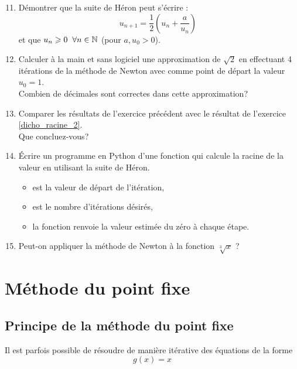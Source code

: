 \documentclass[11pt,a4paper,twoside,greek]{report}
\begin{document}
\bigskip
\begin{boxexstheorieligne}
\begin{enumerate}[label=\textbf{E\thechapter.\arabic*},itemsep=2mm]\setcounter{enumi}{10}
\item\label{alternative:Heron} Démontrer que la suite de Héron peut s'écrire :  $$u_{n+1} = \frac12 \left(u_n+\frac{a}{u_n}\right)\;$$ et que $u_n\geqslant 0 \eh{2} \forall n\in \N$ (pour  $a,u_0>0$). 
\item Calculer à la main et sans logiciel une approximation de $\sqrt{2}$ en effectuant 4 itérations de la méthode de Newton avec comme point de départ la valeur $u_0=1$.\\ Combien de décimales sont correctes dans cette approximation?
\item Comparer les résultats de l'exercice précédent avec le résultat de l'exercice \ref*{dicho_racine_2}.\\ Que concluez-vous?
\item Écrire un programme en Python d'une fonction  qui calcule la racine de la valeur  en utilisant la suite de Héron. 
\begin{itemize}
\item {} est la valeur de départ de l'itération,
\item {} est le nombre d'itérations désirés,
\item la fonction renvoie la valeur estimée du zéro à chaque étape.
\end{itemize}
\item Peut-on appliquer la méthode de Newton à la fonction $\sqrt[3]{x}$ ?
\end{enumerate}
\end{boxexstheorieligne}
\clearpage












\section{Méthode du point fixe}

\subsection{Principe de la méthode du point fixe}
Il est parfois possible de résoudre de manière itérative des équations de la forme $$g(x)=x$$
\end{document}
